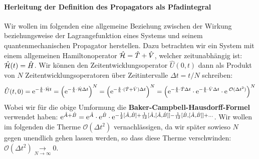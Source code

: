 \paragraph{Herleitung der Definition des Propagators als Pfadintegral}

Wir wollen im folgenden eine allgemeine Beziehung zwischen der Wirkung beziehungsweise der Lagrangefunktion eines Systems und seinem quantenmechanischen Propagator herstellen. Dazu betrachten wir ein System mit einem allgemeinen Hamiltonoperator $\hat{\mathcal H}=\hat{T}+\hat{V}$, welcher zeitunabhängig ist: $\hat{\mathcal H}(t)=\hat{H}$. Wir können den Zeitentwicklungsoperator $\hat{U}(0,t)$ dann als Produkt von $N$ Zeitentwicklungsoperatoren über Zeitintervalle $\Delta t=t/N$ schreiben: 
\begin{eqnarray*}
	\hat{U}(t,0)=\e^{-\frac{\I}{\hbar}\cdot\hat{\ham}t} = \Big(\e^{-\frac{\I}{\hbar}\cdot\hat{\ham}\Delta t}\Big)^N = \Big(\e^{-\frac{\I}{\hbar}\cdot(\hat{T}+\hat{V})\Delta t}\Big)^N = \Big(\e^{-\frac{\I}{\hbar}\cdot\hat{T}\Delta t}\cdot\e^{-\frac{\I}{\hbar}\cdot\hat{V}\Delta t}\cdot\e^{\;\mathcal{O}(\Delta t^2)} \Big)^N
\end{eqnarray*}
Wobei wir für die obige Umformung die {\bf Baker-Campbell-Hausdorff-Formel} verwendet haben: $\mathrm{e}^{\hat{A}+\hat{B}}=\mathrm{e}^{\hat{A}}\cdot\mathrm{e}^{\hat{B}}\cdot\mathrm{e}^{-\frac12[\hat{A},\hat{B}]+\frac{1}{12}[\hat{A},[\hat{A},\hat{B}]]-\frac{1}{12}[\hat{B},[\hat{A},\hat{B}]]+\dots}$. Wir wollen im folgenden die Therme $\mathcal{O}(\Delta t^2)$ vernachlässigen, da wir später sowieso $N$ gegen unendlich gehen lassen werden, so dass diese Therme verschwinden: $\mathcal{O}(\Delta t^2)\!\overset{\;}{\underset{N\to\infty}{\to}}\!0$. 

